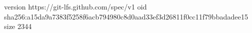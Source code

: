 version https://git-lfs.github.com/spec/v1
oid sha256:a15da9a7383f5258f6acb794980c8d0aad33ef3d26811f0cc11f79bbadadee15
size 2344
